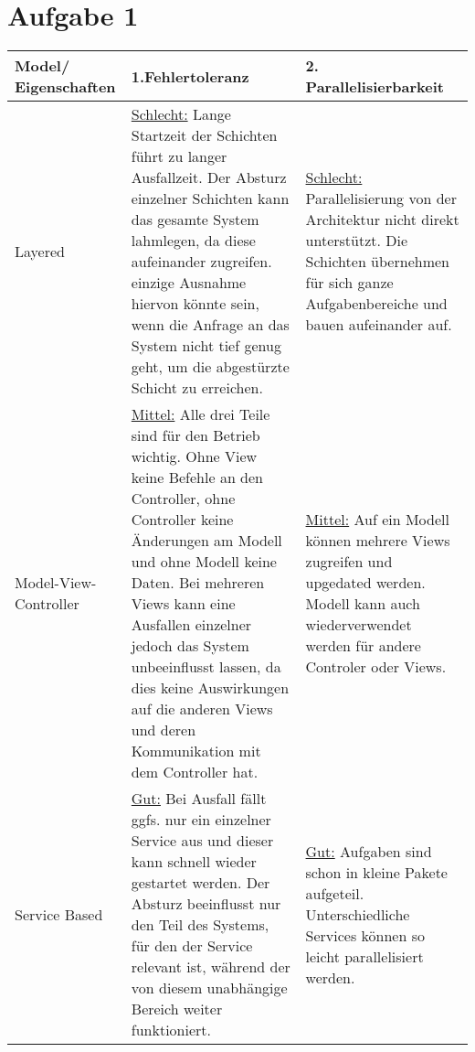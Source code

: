 \chapter*{Aufgabe 1}
\begin{center}
	\begin{tabular}	{|m{4cm}|m{6cm}|m{6cm}|}
		\hline
		Model/ Eigenschaften & 1.Fehlertoleranz & 2. Parallelisierbarkeit  \\
		\hline 
		Layered & \underline{Schlecht:} Lange Startzeit der Schichten führt zu langer Ausfallzeit. Der Absturz einzelner Schichten kann das gesamte System lahmlegen, da diese aufeinander zugreifen. einzige Ausnahme hiervon könnte sein, wenn die Anfrage an das System nicht tief genug geht, um die abgestürzte Schicht zu erreichen. &  \underline{Schlecht:} Parallelisierung von der Architektur nicht direkt unterstützt. Die Schichten übernehmen für sich ganze Aufgabenbereiche und bauen aufeinander auf.   \\
		\hline 
		Model-View-Controller& \underline{Mittel:}
		Alle drei Teile sind für den Betrieb wichtig. Ohne View keine Befehle an den Controller, ohne Controller keine Änderungen am Modell und ohne Modell keine Daten.
	    Bei mehreren Views kann eine Ausfallen einzelner jedoch das System unbeeinflusst lassen, da dies keine Auswirkungen auf die anderen Views und deren Kommunikation mit dem Controller hat.  
		
				 & \underline{Mittel:} Auf ein Modell können mehrere Views zugreifen und upgedated werden. Modell kann auch wiederverwendet werden für andere Controler oder Views.\\
		\hline 
		Service Based& 
		\underline{Gut:} Bei Ausfall fällt ggfs. nur ein einzelner Service aus und dieser kann schnell wieder gestartet werden. Der Absturz beeinflusst nur den Teil des Systems, für den der Service relevant ist, während der von diesem unabhängige Bereich weiter funktioniert. & \underline{Gut:} Aufgaben sind schon in kleine Pakete aufgeteil. Unterschiedliche Services können so leicht parallelisiert werden. \\
		\hline 
	\end{tabular}
\end{center}
